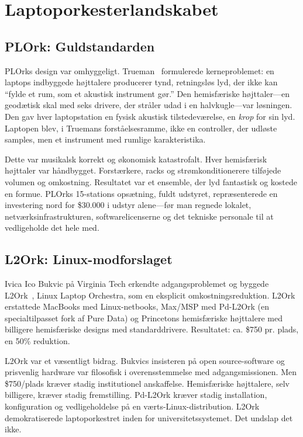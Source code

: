 \documentclass[10pt,letterpaper,twocolumn]{article}
\begin{document}
\section{Laptoporkesterlandskabet}
\label{sec:landscape}

\subsection{PLOrk: Guldstandarden}

PLOrks design var omhyggeligt. Trueman~\citep{trueman2007why} formulerede kerneproblemet: en laptops indbyggede h{\o}jttalere producerer tynd, retningsl{\o}s lyd, der ikke kan ``fylde et rum, som et akustisk instrument g{\o}r.'' Den hemisf{\ae}riske h{\o}jttaler---en geod{\ae}tisk skal med seks drivere, der str{\aa}ler udad i en halvkugle---var l{\o}sningen. Den gav hver laptopstation en fysisk akustisk tilstedev{\ae}relse, en \emph{krop} for sin lyd. Laptopen blev, i Truemans forst{\aa}elsesramme, ikke en controller, der udl{\o}ste samples, men et instrument med rumlige karakteristika.

Dette var musikalsk korrekt og {\o}konomisk katastrofalt. Hver hemisf{\ae}risk h{\o}jttaler var h{\aa}ndbygget. Forst{\ae}rkere, racks og str{\o}mkonditionerere tilf{\o}jede volumen og omkostning. Resultatet var et ensemble, der lyd fantastisk og kostede en formue. PLOrks 15-stations ops{\ae}tning, fuldt udstyret, repr{\ae}senterede en investering nord for \$30.000 i udstyr alene---f{\o}r man regnede lokalet, netv{\ae}rksinfrastrukturen, softwarelicenserne og det tekniske personale til at vedligeholde det hele med.

\subsection{L2Ork: Linux-modforslaget}

Ivica Ico Bukvic p{\aa} Virginia Tech erkendte adgangsproblemet og byggede L2Ork~\citep{bukvic2010l2ork}, Linux Laptop Orchestra, som en eksplicit omkostningsreduktion. L2Ork erstattede MacBooks med Linux-netbooks, Max/MSP med Pd-L2Ork (en specialtilpasset fork af Pure Data) og Princetons hemisf{\ae}riske h{\o}jttalere med billigere hemisf{\ae}riske designs med standarddrivere. Resultatet: ca. \$750 pr. plads, en 50\% reduktion.

L2Ork var et v{\ae}sentligt bidrag. Bukvics insisteren p{\aa} open source-software og prisvenlig hardware var filosofisk i overensstemmelse med adgangsmissionen. Men \$750/plads kr{\ae}ver stadig institutionel anskaffelse. Hemisf{\ae}riske h{\o}jttalere, selv billigere, kr{\ae}ver stadig fremstilling. Pd-L2Ork kr{\ae}ver stadig installation, konfiguration og vedligeholdelse p{\aa} en v{\ae}rts-Linux-distribution. L2Ork demokratiserede laptoporkestret inden for universitetssystemet. Det undslap det ikke.
\end{document}
